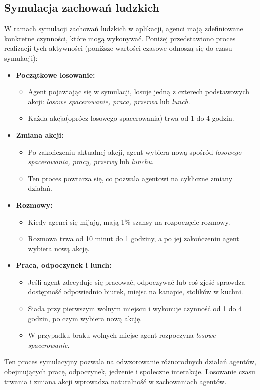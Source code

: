 \subsection{\textbf{Symulacja zachowań ludzkich}}
W ramach symulacji zachowań ludzkich w aplikacji, agenci mają zdefiniowane konkretne czynności, które mogą wykonywać. Poniżej przedstawiono proces realizacji tych aktywności (poniższe wartości czasowe odnoszą się do czasu symulacji):

\begin{itemize}
	\item \textbf{Początkowe losowanie:}
	\begin{itemize}
		\item Agent pojawiając się w symulacji, losuje jedną z czterech podstawowych akcji:\textit{ losowe spacerowanie, praca, przerwa} lub \textit{lunch}.
		\item Każda akcja(oprócz losowego spacerowania) trwa od 1 do 4 godzin.
	\end{itemize}
	
	\item \textbf{Zmiana akcji:}
	\begin{itemize}
		\item Po zakończeniu aktualnej akcji, agent wybiera nową spośród \textit{ losowego spacerowania, pracy, przerwy} lub \textit{lunchu}.
		\item Ten proces powtarza się, co pozwala agentowi na cykliczne zmiany działań.
	\end{itemize}
	
	\item \textbf{Rozmowy:}
	\begin{itemize}
		\item Kiedy agenci się mijają, mają 1\% szansy na rozpoczęcie rozmowy.
		\item Rozmowa trwa od 10 minut do 1 godziny, a po jej zakończeniu agent wybiera nową akcję.
	\end{itemize}
	
	\item \textbf{Praca, odpoczynek i lunch:}
	\begin{itemize}
		\item Jeśli agent zdecyduje się pracować, odpoczywać lub coś zjeść sprawdza dostępność odpowiednio biurek, miejsc na kanapie, stolików w kuchni.
		\item Siada przy pierwszym wolnym miejscu i wykonuje czynność od 1 do 4 godzin, po czym wybiera nową akcję.
		\item W przypadku braku wolnych miejsc agent rozpoczyna \textit{ losowe spacerowanie}.
	\end{itemize}
\end{itemize}

Ten proces symulacyjny pozwala na odwzorowanie różnorodnych działań agentów, obejmujących pracę, odpoczynek, jedzenie i społeczne interakcje. Losowanie czasu trwania i zmiana akcji wprowadza naturalność w zachowaniach agentów.



